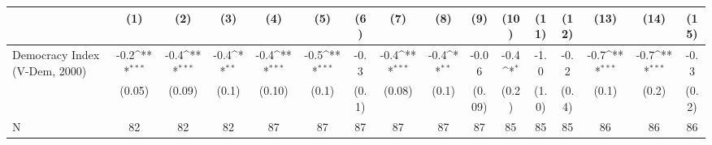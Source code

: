 {
\def\sym#1{\ifmmode^{#1}\else\(^{#1}\)\fi}
\begin{tabular}{l*{15}{c}}
\hline\hline
                    &\multicolumn{1}{c}{(1)}         &\multicolumn{1}{c}{(2)}         &\multicolumn{1}{c}{(3)}         &\multicolumn{1}{c}{(4)}         &\multicolumn{1}{c}{(5)}         &\multicolumn{1}{c}{(6)}         &\multicolumn{1}{c}{(7)}         &\multicolumn{1}{c}{(8)}         &\multicolumn{1}{c}{(9)}         &\multicolumn{1}{c}{(10)}         &\multicolumn{1}{c}{(11)}         &\multicolumn{1}{c}{(12)}         &\multicolumn{1}{c}{(13)}         &\multicolumn{1}{c}{(14)}         &\multicolumn{1}{c}{(15)}         \\
\hline
Democracy Index (V-Dem, 2000)&        -0.2\sym{***}&        -0.4\sym{***}&        -0.4\sym{**} &        -0.4\sym{***}&        -0.5\sym{***}&        -0.3         &        -0.4\sym{***}&        -0.4\sym{**} &       -0.06         &        -0.4\sym{*}  &        -1.0         &        -0.2         &        -0.7\sym{***}&        -0.7\sym{***}&        -0.3         \\
                    &      (0.05)         &      (0.09)         &       (0.1)         &      (0.10)         &       (0.1)         &       (0.1)         &      (0.08)         &       (0.1)         &      (0.09)         &       (0.2)         &       (1.0)         &       (0.4)         &       (0.1)         &       (0.2)         &       (0.2)         \\
\hline
N                   &          82         &          82         &          82         &          87         &          87         &          87         &          87         &          87         &          87         &          85         &          85         &          85         &          86         &          86         &          86         \\
\hline\hline
\end{tabular}
}
